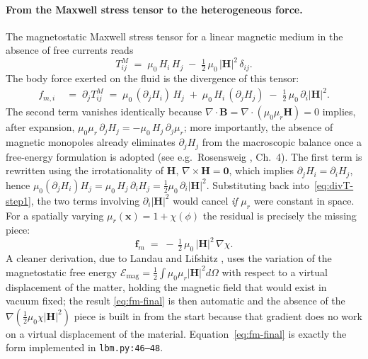 \paragraph{From the Maxwell stress tensor to the heterogeneous force.}
The magnetostatic Maxwell stress tensor for a linear magnetic medium in the absence of free currents reads
\begin{equation}
T^{M}_{ij} \;=\; \mu_0\,H_i\,H_j \;-\; \tfrac{1}{2}\,\mu_0\,|\bm{H}|^{2}\,\delta_{ij}.
\label{eq:maxwell-stress}
\end{equation}
The body force exerted on the fluid is the divergence of this tensor:
\begin{align}
f_{m,i} \;&=\; \partial_j T^{M}_{ij}
\;=\; \mu_0\,(\partial_j H_i)\,H_j \;+\; \mu_0\,H_i\,(\partial_j H_j)
\;-\; \tfrac{1}{2}\,\mu_0\,\partial_i |\bm{H}|^{2}.
\label{eq:divT-step1}
\end{align}
The second term vanishes identically because $\nabla\!\cdot\!\bm{B} = \nabla\!\cdot\!(\mu_0 \mu_r \bm{H}) = 0$ implies, after expansion, $\mu_0\mu_r\,\partial_j H_j = -\mu_0\,H_j\,\partial_j\mu_r$;
more importantly, the absence of magnetic monopoles already eliminates $\partial_j H_j$ from the macroscopic balance once a free-energy formulation is adopted (see e.g.\ Rosensweig \cite{rosensweig1985ferrohydrodynamics}, Ch.~4).
The first term is rewritten using the irrotationality of $\bm{H}$, $\nabla\times\bm{H} = \bm{0}$, which implies $\partial_j H_i = \partial_i H_j$, hence $\mu_0(\partial_j H_i) H_j = \mu_0\,H_j\,\partial_i H_j = \tfrac{1}{2}\mu_0\,\partial_i |\bm{H}|^{2}$.
Substituting back into~\eqref{eq:divT-step1}, the two terms involving $\partial_i|\bm{H}|^{2}$ would cancel \emph{if} $\mu_r$ were constant in space.
For a spatially varying $\mu_r(\bm{x}) = 1 + \chi(\phi)$ the residual is precisely the missing piece:
\begin{equation}
\boxed{\;\bm{f}_m \;=\; -\,\tfrac{1}{2}\,\mu_0\,|\bm{H}|^{2}\,\nabla\chi.\;}
\label{eq:fm-final}
\end{equation}
A cleaner derivation, due to Landau and Lifshitz \cite[\S35]{landau1984electrodynamics}, uses the variation of the magnetostatic free energy $\mathcal{E}_{\mathrm{mag}} = \tfrac{1}{2}\int \mu_0 \mu_r |\bm{H}|^{2} d\Omega$ with respect to a virtual displacement of the matter, holding the magnetic field that would exist in vacuum fixed;
the result \eqref{eq:fm-final} is then automatic and the absence of the $\nabla(\tfrac{1}{2}\mu_0\chi|\bm{H}|^{2})$ piece is built in from the start because that gradient does no work on a virtual displacement of the material.
Equation~\eqref{eq:fm-final} is exactly the form implemented in \texttt{lbm.py:46--48}.

